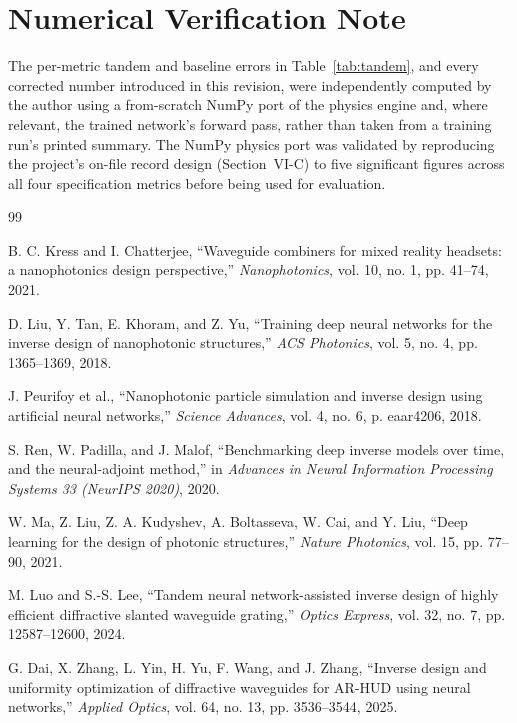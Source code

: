 \documentclass[10pt,twocolumn]{article}
\begin{document}
\section*{Numerical Verification Note}
The per-metric tandem and baseline errors in Table~\ref{tab:tandem}, and
every corrected number introduced in this revision, were independently
computed by the author using a from-scratch NumPy port of the physics
engine and, where relevant, the trained network's forward pass, rather
than taken from a training run's printed summary. The NumPy physics port
was validated by reproducing the project's on-file record design
(Section~VI-C) to five significant figures across all four specification
metrics before being used for evaluation.

\begin{thebibliography}{99}

 B. C. Kress and I. Chatterjee, ``Waveguide combiners for mixed reality headsets: a nanophotonics design perspective,'' \emph{Nanophotonics}, vol. 10, no. 1, pp. 41--74, 2021.

 D. Liu, Y. Tan, E. Khoram, and Z. Yu, ``Training deep neural networks for the inverse design of nanophotonic structures,'' \emph{ACS Photonics}, vol. 5, no. 4, pp. 1365--1369, 2018.

 J. Peurifoy et al., ``Nanophotonic particle simulation and inverse design using artificial neural networks,'' \emph{Science Advances}, vol. 4, no. 6, p. eaar4206, 2018.

 S. Ren, W. Padilla, and J. Malof, ``Benchmarking deep inverse models over time, and the neural-adjoint method,'' in \emph{Advances in Neural Information Processing Systems 33 (NeurIPS 2020)}, 2020.

 W. Ma, Z. Liu, Z. A. Kudyshev, A. Boltasseva, W. Cai, and Y. Liu, ``Deep learning for the design of photonic structures,'' \emph{Nature Photonics}, vol. 15, pp. 77--90, 2021.

 M. Luo and S.-S. Lee, ``Tandem neural network-assisted inverse design of highly efficient diffractive slanted waveguide grating,'' \emph{Optics Express}, vol. 32, no. 7, pp. 12587--12600, 2024.

 G. Dai, X. Zhang, L. Yin, H. Yu, F. Wang, and J. Zhang, ``Inverse design and uniformity optimization of diffractive waveguides for AR-HUD using neural networks,'' \emph{Applied Optics}, vol. 64, no. 13, pp. 3536--3544, 2025.


\end{thebibliography}
\end{document}
